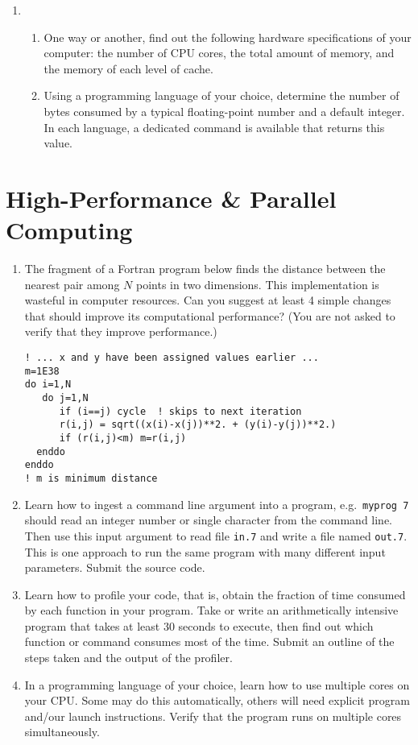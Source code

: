 \documentclass{article}
\begin{document}
\begin{enumerate}
\item
  \begin{enumerate} \setlength{\itemsep}{0pt}
  \item One way or another, find out the following hardware specifications of your computer: the number of CPU cores, the total amount of memory, and the memory of each level of cache.
  \item Using a programming language of your choice, determine the number of bytes consumed by a typical floating-point number and a default integer. In each language, a dedicated command is available that returns this value.
\end{enumerate}
    
\end{enumerate}




\newpage
\section{High-Performance \& Parallel Computing}
\begin{enumerate}
\item  %

The fragment of a Fortran program below finds the distance between the nearest pair among $N$ points in two dimensions.  This implementation is wasteful in computer resources.
Can you suggest at least 4 simple changes that should improve its computational performance?
(You are not asked to verify that they improve performance.)
\begin{verbatim}
! ... x and y have been assigned values earlier ...
m=1E38
do i=1,N
   do j=1,N
      if (i==j) cycle  ! skips to next iteration
      r(i,j) = sqrt((x(i)-x(j))**2. + (y(i)-y(j))**2.)
      if (r(i,j)<m) m=r(i,j)
  enddo
enddo
! m is minimum distance
\end{verbatim}


\item
Learn how to ingest a command line argument into a program, e.g.\ {\tt myprog 7} should read an integer number or single character from the command line. Then use this input argument to read file {\tt in.7} and write a file named {\tt out.7}.
This is one approach to run the same program with many different input parameters.
Submit the source code.

\item Learn how to profile your code, that is, obtain the fraction of time consumed by each function in your program. Take or write an arithmetically intensive program that takes at least 30 seconds to execute, then find out which function or command consumes most of the time.
Submit an outline of the steps taken and the output of the profiler.
  
\item
  In a programming language of your choice, learn how to use multiple cores on your CPU. Some may do this automatically, others will need explicit program and/our launch instructions.  Verify that the program runs on multiple cores simultaneously.
  
\end{enumerate}
\end{document}
